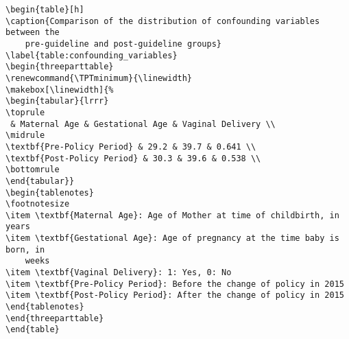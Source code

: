 \documentclass[11pt]{article}
\begin{document}
\begin{Verbatim}[tabsize=4]
\begin{table}[h]
\caption{Comparison of the distribution of confounding variables between the
	pre-guideline and post-guideline groups}
\label{table:confounding_variables}
\begin{threeparttable}
\renewcommand{\TPTminimum}{\linewidth}
\makebox[\linewidth]{%
\begin{tabular}{lrrr}
\toprule
 & Maternal Age & Gestational Age & Vaginal Delivery \\
\midrule
\textbf{Pre-Policy Period} & 29.2 & 39.7 & 0.641 \\
\textbf{Post-Policy Period} & 30.3 & 39.6 & 0.538 \\
\bottomrule
\end{tabular}}
\begin{tablenotes}
\footnotesize
\item \textbf{Maternal Age}: Age of Mother at time of childbirth, in years
\item \textbf{Gestational Age}: Age of pregnancy at the time baby is born, in
	weeks
\item \textbf{Vaginal Delivery}: 1: Yes, 0: No
\item \textbf{Pre-Policy Period}: Before the change of policy in 2015
\item \textbf{Post-Policy Period}: After the change of policy in 2015
\end{tablenotes}
\end{threeparttable}
\end{table}

\end{Verbatim}




\end{document}
